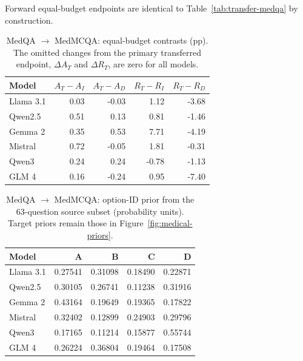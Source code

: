 Forward equal-budget endpoints are identical to Table~\ref{tab:transfer-medqa} by construction.


\begin{table}[H]
\centering\small\setlength{\tabcolsep}{5pt}
\caption{MedQA $\to$ MedMCQA: equal-budget contrasts (pp). The omitted changes from the primary transferred endpoint, $\Delta A_T$ and $\Delta R_T$, are zero for all models.}\label{tab:eq-contrasts-medqa}
\begin{tabular}{lrrrr}
\toprule
Model & $A_T-A_I$ & $A_T-A_D$ & $R_T-R_I$ & $R_T-R_D$\\
\midrule
Llama 3.1 & 0.03 & -0.03 & 1.12 & -3.68\\
Qwen2.5 & 0.51 & 0.13 & 0.81 & -1.46\\
Gemma 2 & 0.35 & 0.53 & 7.71 & -4.19\\
Mistral & 0.72 & -0.05 & 1.81 & -0.31\\
Qwen3 & 0.24 & 0.24 & -0.78 & -1.13\\
GLM 4 & 0.16 & -0.24 & 0.95 & -7.40\\
\bottomrule
\end{tabular}
\end{table}


\begin{table}[H]
\centering\small\setlength{\tabcolsep}{5pt}
\caption{MedQA $\to$ MedMCQA: option-ID prior from the 63-question source subset (probability units). Target priors remain those in Figure~\ref{fig:medical-priors}.}\label{tab:eq-prior-medqa}
\begin{tabular}{lrrrr}
\toprule
Model & A & B & C & D\\
\midrule
Llama 3.1 & 0.27541 & 0.31098 & 0.18490 & 0.22871\\
Qwen2.5 & 0.30105 & 0.26741 & 0.11238 & 0.31916\\
Gemma 2 & 0.43164 & 0.19649 & 0.19365 & 0.17822\\
Mistral & 0.32402 & 0.12899 & 0.24903 & 0.29796\\
Qwen3 & 0.17165 & 0.11214 & 0.15877 & 0.55744\\
GLM 4 & 0.26224 & 0.36804 & 0.19464 & 0.17508\\
\bottomrule
\end{tabular}
\end{table}


